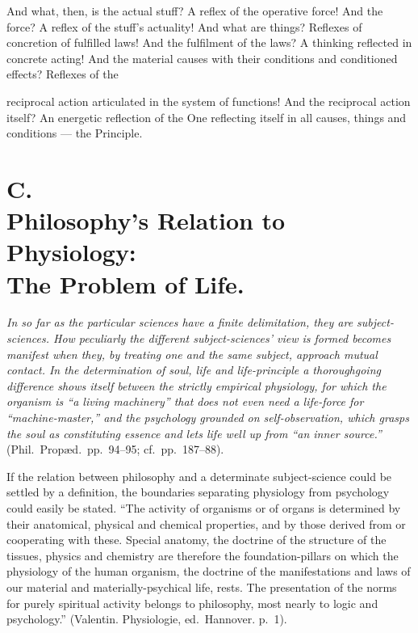 \documentclass[12pt,a4paper]{book}
\begin{document}
And what, then, is the actual stuff? A reflex of the operative force! And the
force? A reflex of the stuff's actuality! And what are things? Reflexes of
concretion of fulfilled laws! And the fulfilment of the laws? A thinking
reflected in concrete acting! And the material causes with their conditions and
conditioned effects? Reflexes of the

reciprocal action articulated in the system of functions! And the reciprocal
action itself? An energetic reflection of the One reflecting itself in all
causes, things and conditions --- the Principle.

\section*{C.\\ Philosophy's Relation to Physiology:\\
  The Problem of Life.}


\emph{In so far as the particular sciences have a finite delimitation, they are
subject-sciences. How peculiarly the different subject-sciences' view is formed
becomes manifest when they, by treating one and the same subject, approach
mutual contact. In the determination of soul, life and life-principle a
thoroughgoing difference shows itself between the strictly empirical
physiology, for which the organism is ``a living machinery'' that does not even
need a life-force for ``machine-master,'' and the psychology grounded on
self-observation, which grasps the soul as constituting essence and lets life
well up from ``an inner source.''} (Phil.\ Propæd.\ pp.~94--95; cf.\
pp.~187--88).

If the relation between philosophy and a determinate subject-science could be
settled by a definition, the boundaries separating physiology from psychology
could easily be stated. ``The activity of organisms or of organs is determined
by their anatomical, physical and chemical properties, and by those derived
from or cooperating with these. Special anatomy, the doctrine of the structure
of the tissues, physics and chemistry are therefore the foundation-pillars on
which the physiology of the human organism,
the doctrine of the manifestations and laws of our material and
materially-psychical life, rests. The presentation of the norms for purely
spiritual activity belongs to philosophy, most nearly to logic and psychology.''
(Valentin. Physiologie, ed.\ Hannover. p.~1).
\end{document}
